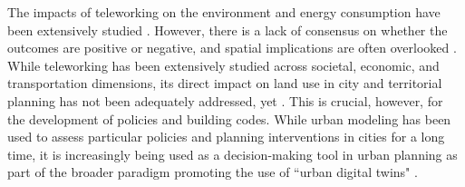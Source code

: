 The impacts of teleworking on the environment and energy consumption have been extensively studied \citep{Giovanis2018, Dissanayake2008, Fu2012EnvironmentalSocio-demographics, Koenig1996UsingProject, Kitou2008ExternalTelework}. However, there is a lack of consensus on whether the outcomes are positive or negative, and spatial implications are often overlooked \citep{Dissanayake2008,Kitou2008ExternalTelework, Bussiere2002Impact1996-2016, Jaff2018EstimatingMalaysia}. While teleworking has been extensively studied across societal, economic, and transportation dimensions, its direct impact on land use in city and territorial planning has not been adequately addressed, yet \citep{Zenkteler2019Home-basedResponse}. This is crucial, however, for the development of policies and building codes. While urban modeling has been used to assess particular policies and planning interventions in cities \citep{Alonso2017ModellingMadrid, Lopane2023AModeling} for a long time, it is increasingly being used as a decision-making tool in urban planning as part of the broader paradigm promoting the use of ``urban digital twins" \citep{Batty2018, Bettencourt2024RecentTwins}.


